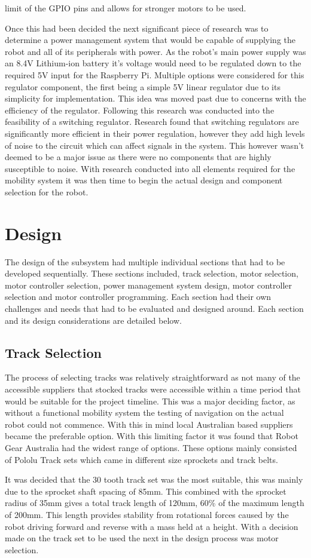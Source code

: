 \documentclass{article}
\begin{document}
limit of the GPIO pins and allows for stronger motors to be used.
\par
Once this had been decided the next significant piece of research was to determine a power management system that would be capable of supplying the robot and all of its
peripherals with power. As the robot's main power supply was an 8.4V Lithium-ion battery it's voltage would need to be regulated down to the required 5V input for the
Raspberry Pi. Multiple options were considered for this regulator component, the first being a simple 5V linear regulator due to its simplicity for implementation.
This idea was moved past due to concerns with the efficiency of the regulator. Following this research was conducted into the feasibility of a switching regulator.
Research found that switching regulators are significantly more efficient in their power regulation, however they add high levels of noise to the circuit which can
affect signals in the system. This however wasn't deemed to be a major issue as there were no components that are highly susceptible to noise. With research conducted
into all elements required for the mobility system it was then time to begin the actual design and component selection for the robot.
\pagebreak
\section{Design}
The design of the subsystem had multiple individual sections that had to be developed sequentially. These sections included, track selection, motor selection,
motor controller selection, power management system design, motor controller selection and motor controller programming. Each section had their own challenges and 
needs that had to be evaluated and designed around. Each section and its design considerations are detailed below.
\par
\subsection{Track Selection}
The process of selecting tracks was relatively straightforward as not many of the accessible suppliers that stocked tracks were accessible within a time period that would
be suitable for the project timeline. This was a major deciding factor, as without a functional mobility system the testing of navigation on the actual robot could not
commence. With this in mind local Australian based suppliers became the preferable option. With this limiting factor it was found that Robot Gear Australia had the widest
range of options. These options mainly consisted of Pololu Track sets which came in different size sprockets and track belts.
\par
It was decided that the 30 tooth track set was the most suitable, this was mainly due to the sprocket shaft spacing of 85mm. This combined with the sprocket radius of 35mm
gives a total track length of 120mm, 60\% of the maximum length of 200mm. This length provides stability from rotational forces caused by the robot driving forward and
reverse with a mass held at a height. With a decision made on the track set to be used the next in the design process was motor selection.
\par
\end{document}
